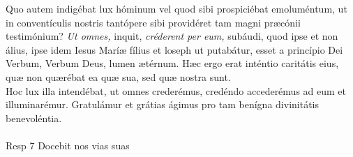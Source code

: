 \documentclass[options]{article}
\begin{document}
	Quo autem indigébat lux hóminum vel quod sibi prospiciébat emoluméntum, ut in conventículis nostris tantópere sibi providéret tam magni præcónii testimónium? \emph{Ut omnes,} inquit, \emph{créderent per eum,} subáudi, quod ipse et non álius, ipse idem Iesus Maríæ fílius et loseph ut putabátur, esset a princípio Dei Verbum, Verbum Deus, lumen ætérnum. Hæc ergo erat inténtio caritátis eius, quæ non quærébat ea quæ sua, sed quæ nostra sunt.\\
	Hoc lux illa intendébat, ut omnes crederémus, credéndo accederémus ad eum et illuminarémur. Gratulámur et grátias ágimus pro tam benígna divinitátis benevoléntia.\\
	\\
	Resp 7 Docebit nos vias suas
\end{document}
